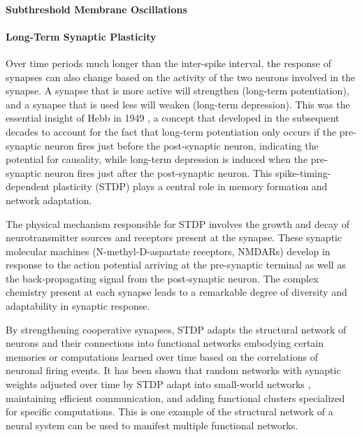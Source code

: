 \paragraph{\label{sec:subthreshold_membrane_oscillations}Subthreshold Membrane Oscillations}

\paragraph{\label{sec:long_term_plasticity}Long-Term Synaptic Plasticity}
Over time periods much longer than the inter-spike interval, the response of synapses can also change based on the activity of the two neurons involved in the synapse. A synapse that is more active will strengthen (long-term potentiation), and a synapse that is used less will weaken (long-term depression). This was the essential insight of Hebb in 1949 \cite{he1949}, a concept that developed in the subsequent decades \cite{bipo1998,somi2000} to account for the fact that long-term potentiation only occurs if the pre-synaptic neuron fires just before the post-synaptic neuron, indicating the potential for causality, while long-term depression is induced when the pre-synaptic neuron fires just after the post-synaptic neuron. This spike-timing-dependent plasticity (STDP) \cite{mage2012} plays a central role in memory formation and network adaptation. 

The physical mechanism responsible for STDP involves the growth and decay of neurotransmitter sources and receptors present at the synapse. These synaptic molecular machines (N-methyl-D-aspartate receptors, NMDARs) develop in response to the action potential arriving at the pre-synaptic terminal as well as the back-propagating signal from the post-synaptic neuron. The complex chemistry present at each synapse leads to a remarkable degree of diversity and adaptability in synaptic response.

By strengthening cooperative synapses, STDP adapts the structural network of neurons and their connections into functional networks embodying certain memories or computations learned over time based on the correlations of neuronal firing events. It has been shown that random networks with synaptic weights adjusted over time by STDP adapt into small-world networks \cite{shki2006}, maintaining efficient communication, and adding functional clusters specialized for specific computations. This is one example of the structural network of a neural system can be used to manifest multiple functional networks.

